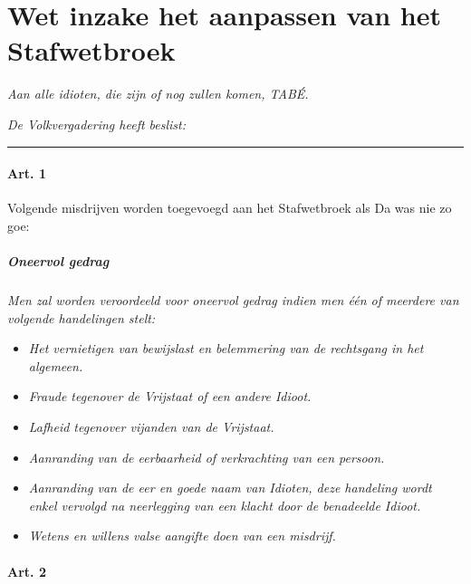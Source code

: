 \hypertarget{wet-inzake-het-aanpassen-van-het-stafwetbroek}{%
\section{Wet inzake het aanpassen van het
Stafwetbroek}\label{wet-inzake-het-aanpassen-van-het-stafwetbroek}}

\emph{Aan alle idioten, die zijn of nog zullen komen, TABÉ.}

\emph{De Volkvergadering heeft beslist:}

\begin{center}\rule{0.5\linewidth}{0.5pt}\end{center}

\hypertarget{art.-1}{%
\paragraph{Art. 1}\label{art.-1}}

Volgende misdrijven worden toegevoegd aan het Stafwetbroek als Da was
nie zo goe:

\hypertarget{oneervol-gedrag}{%
\subparagraph{\texorpdfstring{\emph{Oneervol
gedrag}}{Oneervol gedrag}}\label{oneervol-gedrag}}

\emph{Men zal worden veroordeeld voor oneervol gedrag indien men één of
meerdere van volgende handelingen stelt:}

\begin{itemize}
\tightlist
\item
  \emph{Het vernietigen van bewijslast en belemmering van de rechtsgang
  in het algemeen.}
\item
  \emph{Fraude tegenover de Vrijstaat of een andere Idioot.}
\item
  \emph{Lafheid tegenover vijanden van de Vrijstaat.}
\item
  \emph{Aanranding van de eerbaarheid of verkrachting van een persoon.}
\item
  \emph{Aanranding van de eer en goede naam van Idioten, deze handeling
  wordt enkel vervolgd na neerlegging van een klacht door de benadeelde
  Idioot.}
\item
  \emph{Wetens en willens valse aangifte doen van een misdrijf.}
\end{itemize}

\hypertarget{art.-2}{%
\paragraph{Art. 2}\label{art.-2}}

